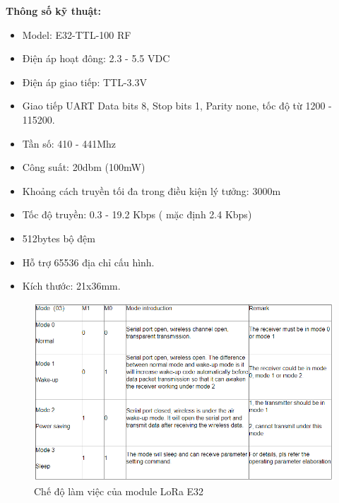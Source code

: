 \indent \textbf{Thông số kỹ thuật:}
\begin{itemize}
	\item Model: E32-TTL-100 RF
	\item Điện áp hoạt đông: 2.3 - 5.5 VDC
	\item Điện áp giao tiếp: TTL-3.3V
	\item Giao tiếp UART Data bits 8, Stop bits 1, Parity none, tốc độ từ 1200 - 115200.
	\item Tần số: 410 - 441Mhz
	\item Công suất: 20dbm (100mW)
	\item Khoảng cách truyền tối đa trong điều kiện lý tưởng: 3000m
	\item Tốc độ truyền: 0.3 - 19.2 Kbps ( mặc định 2.4 Kbps)
	\item 512bytes bộ đệm
	\item Hỗ trợ 65536 địa chỉ cấu hình.
	\item Kích thước: 21x36mm.
\end{itemize}
\begin{figure}[H]
	\centering
	\includegraphics[scale=.5]{Chapter 2/image chapter 2/workmodeE32.png}
	\caption[Chế độ làm việc của module LoRa E32]{Chế độ làm việc của module LoRa E32}
	\label{hinh37}
\end{figure}

